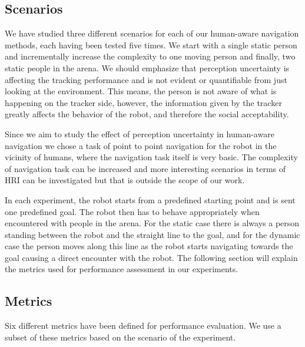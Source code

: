 \subsection{Scenarios}
\label{sec:scenarios}

We have studied three different scenarios for each of our human-aware navigation methods, each having been tested five times. We start with a single static person and incrementally increase the complexity to one moving person and finally, two static people in the arena. We should emphasize that perception uncertainty is affecting the tracking performance and is not evident or quantifiable from just looking at the environment. This means, the person is not aware of what is happening on the tracker side, however, the information given by the tracker greatly affects the behavior of the robot, and therefore the social acceptability. 


Since we aim to study the effect of perception uncertainty in human-aware navigation we chose a task of point to point navigation for the robot in the vicinity of humans, where the navigation task itself is very basic. The complexity of navigation task can be increased and more interesting scenarios in terms of HRI can be investigated but that is outside the scope of our work. 

In each experiment, the robot starts from a predefined starting point and is sent one predefined goal. The robot then has to behave appropriately when encountered with people in the arena. For the static case there is always a person standing between the robot and the straight line to the goal, and for the dynamic case the person moves along this line as the robot starts navigating towards the goal causing a direct encounter with the robot. The following section will explain the metrics used for performance assessment in our experiments.

%




\subsection{Metrics}

Six different metrics have been defined for performance evaluation. We use a subset of these metrics based on the scenario of the experiment.

